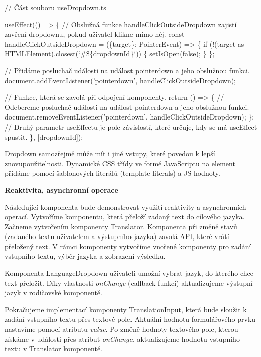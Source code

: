 \begin{prog}
// Část souboru useDropdown.ts

useEffect(() => \{
  // Obslužná funkce handleClickOutsideDropdown zajistí zavření dropdownu,
    pokud uživatel klikne mimo něj.
  const handleClickOutsideDropdown = (\{target\}: PointerEvent) => \{
    if (!(target as HTMLElement).closest(`#\$\{dropdownId\}`)) \{
      setIsOpen(false);
    \}
  \};

  // Přidáme posluchač události na událost pointerdown a jeho obslužnou funkci.
  document.addEventListener('pointerdown', handleClickOutsideDropdown);

  // Funkce, která se zavolá při odpojení komponenty.
  return () => \{
    // Odebereme posluchač události na událost
      pointerdown a jeho obslužnou funkci.
    document.removeEventListener('pointerdown', handleClickOutsideDropdown);
  \};
  // Druhý parametr useEffectu je pole závislostí, 
    které určuje, kdy se má useEffect spustit.
\}, [dropdownId]);
\end{prog}

Dropdown samozřejmě může mít i jiné vstupy, které povedou k lepší znovupoužitelnosti. 
Dynamické CSS třídy ve formě JavaScriptu na element přidáme pomocí šablonových literálů (template literals) a JS hodnoty.

\begin{flushleft}
  \textbf{Reaktivita, asynchronní operace}
\end{flushleft}

Následující komponenta bude demonstrovat využití reaktivity a asynchronních operací. Vytvoříme komponentu, která přeloží zadaný text do cílového jazyka. 
Začneme vytvořením komponenty Translator. Komponenta při změně stavů (zadaného textu uživatelem a výstupního jazyka) zavolá API, které vrátí přeložený text.
V rámci komponenty vytvoříme vnořené komponenty pro zadání vstupního textu, výběr jazyka a zobrazení výsledku.

Komponenta LanguageDropdown uživateli umožní vybrat jazyk, do kterého chce text přeložit. 
Díky vlastnosti \emph{onChange} (callback funkci) aktualizujeme výstupní jazyk v rodičovské komponentě. 

Pokračujeme implementací komponenty TranslationInput, která bude sloužit k zadání vstupního textu přes textové pole. Aktuální hodnotu formulářového prvku nastavíme pomocí atributu \emph{value}.
Po změně hodnoty textového pole, kterou získáme v události přes atribut \emph{onChange}, aktualizujeme hodnotu vstupního textu v Translator komponentě.

